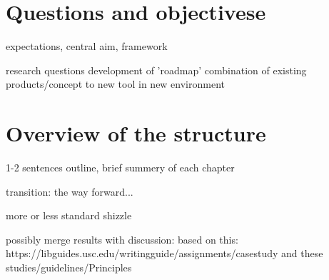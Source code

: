\section{Questions and objectivese}
expectations, central aim, framework



research questions
development of 'roadmap'
combination of existing products/concept to new tool in new environment




\section{Overview of the structure}
1-2 sentences outline, brief summery of each chapter

transition: the way forward...

more or less standard shizzle

possibly merge results with discussion: based on this: https://libguides.usc.edu/writingguide/assignments/casestudy and these studies/guidelines/Principles

